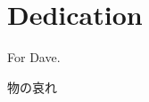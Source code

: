 
\pagestyle{empty}

\chapter{Dedication}

For Dave.

\begin{CJK}{UTF8}{min}
  物の哀れ
\end{CJK}




\clearpage
